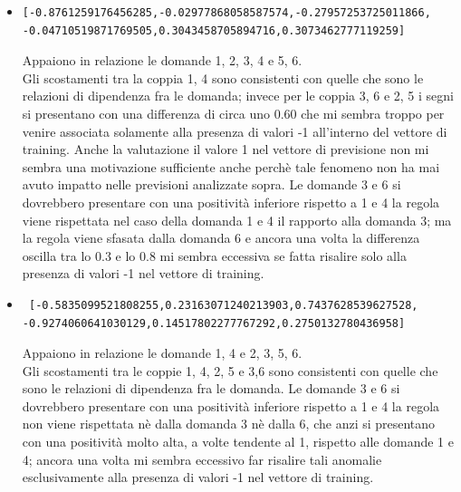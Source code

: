 \documentclass[11pt,a4paper,italian]{article}
\begin{document}
\begin{itemize}
\item \begin{verbatim}[-0.8761259176456285,-0.02977868058587574,-0.27957253725011866,
-0.04710519871769505,0.3043458705894716,0.3073462777119259]
\end{verbatim}
Appaiono in relazione le domande 1, 2, 3, 4  e 5, 6.\\
Gli scostamenti tra la coppia 1, 4 sono consistenti con quelle che sono le relazioni di dipendenza fra le domanda; invece per le coppia 3, 6 e 2, 5 i segni si presentano con una differenza di circa uno 0.60 che mi sembra troppo per venire associata solamente alla presenza di valori -1 all'interno del vettore di training. Anche la valutazione il valore 1 nel vettore di previsione non mi sembra una motivazione sufficiente anche perch\`e tale fenomeno non ha mai avuto impatto nelle previsioni analizzate sopra.
Le domande 3 e 6 si dovrebbero presentare con una positivit\`a inferiore rispetto a 1 e 4 la regola viene rispettata nel caso della domanda 1 e 4 il rapporto alla domanda 3; ma la regola viene sfasata dalla domanda 6 e ancora una volta la differenza oscilla tra lo 0.3 e lo 0.8 mi sembra eccessiva se fatta risalire solo alla presenza di valori -1 nel vettore di training.

\item \begin{verbatim} [-0.5835099521808255,0.23163071240213903,0.7437628539627528,
-0.9274060641030129,0.14517802277767292,0.2750132780436958]
\end{verbatim}
Appaiono in relazione le domande 1, 4 e 2, 3, 5, 6.\\
Gli scostamenti tra le coppie 1, 4, 2, 5 e 3,6  sono consistenti con quelle che sono le relazioni di dipendenza fra le domanda.
Le domande 3 e 6 si dovrebbero presentare con una positivit\`a inferiore rispetto a 1 e 4 la regola non viene rispettata n\`e dalla domanda 3 n\`e dalla 6, che anzi si presentano con una positivit\`a molto alta, a volte tendente al 1, rispetto alle domande 1 e 4; ancora una volta mi sembra eccessivo far risalire tali anomalie esclusivamente alla presenza di valori -1 nel vettore di training.


\end{itemize}
\end{document}
